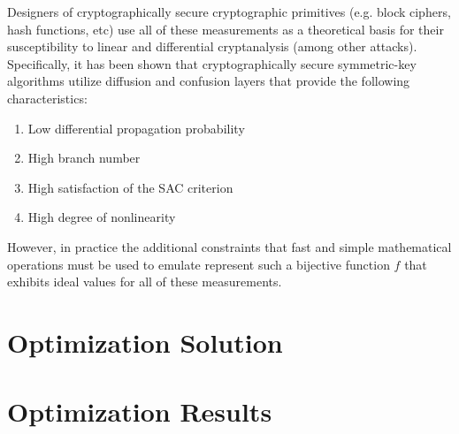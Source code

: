 \documentclass[11pt]{article}
\begin{document}
Designers of cryptographically secure cryptographic primitives (e.g. block ciphers, hash functions, etc) use all of these measurements as a theoretical basis for their susceptibility to linear and differential cryptanalysis (among other attacks). Specifically, it has been shown that cryptographically secure symmetric-key algorithms utilize diffusion and confusion layers that provide the following characteristics:
\begin{enumerate}
	\item Low differential propagation probability
	\item High branch number
	\item High satisfaction of the SAC criterion
	\item High degree of nonlinearity
\end{enumerate}
However, in practice the additional constraints that fast and simple mathematical operations must be used to emulate represent such a bijective function $f$ that exhibits ideal values for all of these measurements.

\section{Optimization Solution}

\section{Optimization Results}
\end{document}
